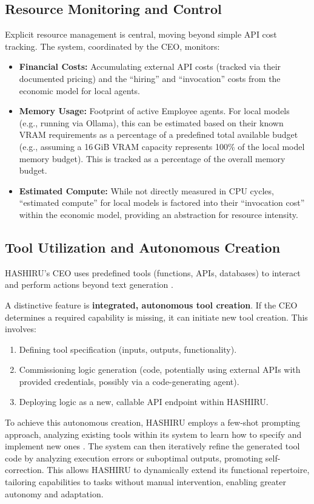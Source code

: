 \documentclass[conference]{IEEEtran}
\begin{document}
\subsection{Resource Monitoring and Control}
\label{subsec:resource_mgmt}
Explicit resource management is central, moving beyond simple API cost tracking. The system, coordinated by the CEO, monitors:
\begin{itemize}
    \item \textbf{Financial Costs:} Accumulating external API costs (tracked via their documented pricing) and the ``hiring'' and ``invocation'' costs from the economic model for local agents.
    \item \textbf{Memory Usage:} Footprint of active Employee agents. For local models (e.g., running via Ollama), this can be estimated based on their known VRAM requirements as a percentage of a predefined total available budget (e.g., assuming a 16\,GiB VRAM capacity represents 100\% of the local model memory budget). This is tracked as a percentage of the overall memory budget.
    \item \textbf{Estimated Compute:} While not directly measured in CPU cycles, ``estimated compute'' for local models is factored into their ``invocation cost'' within the economic model, providing an abstraction for resource intensity.
\end{itemize}
\subsection{Tool Utilization and Autonomous Creation}
\label{subsec:tooling}
HASHIRU's CEO uses predefined tools (functions, APIs, databases) to interact and perform actions beyond text generation \cite{yao2022react, openai_func_calling}.

A distinctive feature is \textbf{integrated, autonomous tool creation}. If the CEO determines a required capability is missing, it can initiate new tool creation. This involves:
\begin{enumerate}
    \item Defining tool specification (inputs, outputs, functionality).
    \item Commissioning logic generation (code, potentially using external APIs with provided credentials, possibly via a code-generating agent).
    \item Deploying logic as a new, callable API endpoint within HASHIRU.
\end{enumerate}
To achieve this autonomous creation, HASHIRU employs a few-shot prompting approach, analyzing existing tools within its system to learn how to specify and implement new ones \cite{brown2020language}. The system can then iteratively refine the generated tool code by analyzing execution errors or suboptimal outputs, promoting self-correction. This allows HASHIRU to dynamically extend its functional repertoire, tailoring capabilities to tasks without manual intervention, enabling greater autonomy and adaptation.
\end{document}
